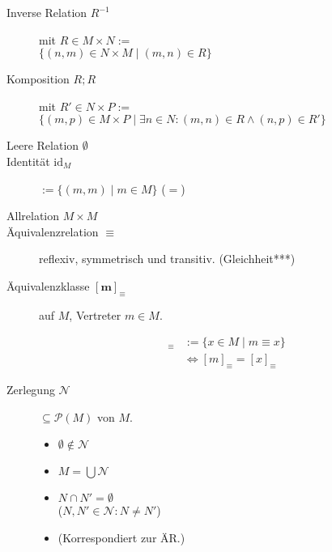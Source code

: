 \documentclass[uniLeipzig]{merkzettel}
\begin{document}
\begin{mzImportant}
  \begin{description}
    \item [Inverse Relation $R^{-1}$]
          mit $R \in M \times N :=$ \\
          $\{ (n, m) \in N \times M \mid (m, n) \in R \}$

    \item [Komposition $R ; R$]
          mit $R' \in N \times P :=$ \\
          $\{ (m, p) \in M \times P \mid \exists n \in N: (m, n) \in R \land (n, p) \in R' \}$

    \item [Leere Relation $\emptyset$]

    \item [Identität $\text{id}_M$]
          $:= \{ (m,m) \mid m \in M \}$ ($=$)

    \item [Allrelation $M \times M$]

    \item [Äquivalenzrelation $\boldsymbol{\equiv}$]
          reflexiv, symmetrisch und transitiv. (Gleichheit***)

          \item[Äquivalenzklasse $\mathbf{[m]_\equiv}$]
          auf $M$, Vertreter $m \in M$.

          \begin{align*}
            [m]_\equiv & := \{ x \in M \mid m \equiv x \}        \\
                       & \Leftrightarrow [m]_\equiv = [x]_\equiv
          \end{align*}

    \item [Zerlegung $\boldsymbol{\mathcal{N}}$]
          $\subseteq \mathcal{P}(M)$ von $M$.

          \begin{itemize}
            \item $\emptyset \notin \mathcal{N}$
            \item $M = \bigcup \mathcal{N}$
            \item $N \cap N' = \emptyset$ \\
                  ($N, N' \in \mathcal{N}: N \neq N'$)
            \item (Korrespondiert zur ÄR.)
          \end{itemize}


\end{description}
\end{mzImportant}
\end{document}
